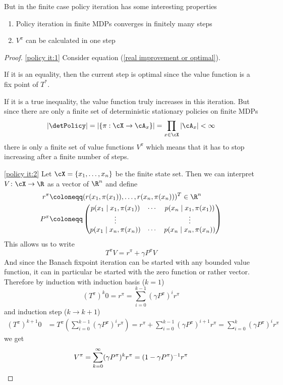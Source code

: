But in the finite case policy iteration has some interesting properties

\begin{corollary}\leavevmode
	\begin{enumerate}[label=(\roman*), font=\normalfont]
		\item\label{policy it:1} Policy iteration in finite MDPs converges in finitely many steps
		\item\label{policy it:2} \(V^\pi\) can be calculated in one step 
	   
   \end{enumerate}
\end{corollary}
\begin{proof}
	\ref{policy it:1} \parencite{szepesvariAlgorithmsReinforcementLearning2010} Consider equation (\ref{real improvement or optimal}). 
	
	If it is an equality, then the current step is optimal since the value function is a fix point of \(T^*\). 
	
	If it is a true inequality, the value function truly increases in this iteration. 
	But since there are only a finite set of deterministic stationary policies on finite MDPs
	\[
		|\detPolicy| = |\{\pi:\cX\to \cA_x\}| = \prod_{x\in\cX} |\cA_x | < \infty
	\]
	there is only a finite set of value functions \(V^\pi\) which means that it has to stop increasing after a finite number of steps. 

	\ref{policy it:2} Let \(\cX = \{x_1,\dots,x_n\}\) be the finite state set. Then we can interpret \(V\colon \cX\to \R\) as a vector of \(\R^n\) and define
 	\begin{align*}
		r^\pi &\coloneqq (r(x_1,\pi(x_1)),\dots, r(x_n,\pi(x_n)))^T \in \R^n\\
		P^\pi &\coloneqq 
		\begin{pmatrix}
			p(x_1 \mid x_1,\pi(x_1)) & \cdots & p(x_n \mid x_1, \pi(x_1))\\
			\vdots & & \vdots\\
			p(x_1 \mid x_n,\pi(x_n)) & \cdots & p(x_n \mid x_n, \pi(x_n))
		\end{pmatrix}
	\end{align*}
	This allows us to write
	\[
		   T^\pi V= r^\pi +\gamma P^\pi V 
	\]
	And since the Banach fixpoint iteration can be started with any bounded value function, it can in particular be started with the zero function or rather vector. Therefore by induction with induction basis (\(k=1\))
	\[ (T^\pi)^k 0 = r^\pi = \sum_{i=0}^{k-1} (\gamma P^\pi)^i r^\pi\]
	and induction step (\(k\to k+1\))
	\begin{align*}
		(T^\pi)^{k+1} 0 &= T^\pi \left(\sum_{i=0}^{k-1} (\gamma P^\pi)^i r^{\pi}\right)
		= r^\pi + \sum_{i=0}^{k-1} (\gamma P^\pi)^{i+1} r^\pi
		= \sum_{i=0}^{k} (\gamma P^\pi)^{i} r^\pi
	\end{align*}
	we get
	\[
		V^\pi = \sum_{k=0}^\infty (\gamma P^\pi)^k r^\pi = (1-\gamma P^\pi)^{-1} r^\pi \qedhere
	\]
\end{proof}







\endinput
